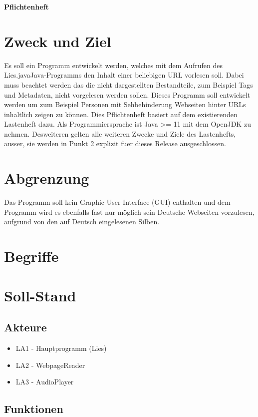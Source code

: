 \documentclass[11pt]{scrartcl}
\begin{document}
\begin{center}
\textbf{Pflichtenheft}
\end{center}

\section{Zweck und Ziel}
Es soll ein Programm entwickelt werden, welches mit dem Aufrufen des \glqq Lies.java\grqq Java-Programms den Inhalt einer beliebigen URL vorlesen soll. Dabei muss beachtet werden das die nicht dargestellten Bestandteile, zum Beispiel Tags und Metadaten, nicht vorgelesen werden sollen. Dieses Programm soll entwickelt werden um zum Beispiel Personen mit Sehbehinderung Webseiten hinter URLs inhaltlich zeigen zu können. Dies Pflichtenheft basiert auf dem existierenden Lastenheft dazu. Als Programmiersprache ist Java >= 11 mit dem OpenJDK zu nehmen. Desweiteren gelten alle weiteren Zwecke und Ziele des Lastenhefts, ausser, sie werden in Punkt 2 explizit fuer dieses Release ausgeschlossen.

\section{Abgrenzung}
Das Programm soll kein Graphic User Interface (GUI) enthalten und dem Programm wird es ebenfalls fast nur möglich sein Deutsche Webseiten vorzulesen, aufgrund von den auf Deutsch eingelesenen Silben.

\section{Begriffe}


\section{Soll-Stand}


\subsection{Akteure}

\begin{itemize}
	\item LA1 - Hauptprogramm (Lies)
	\item LA2 - WebpageReader
	\item LA3 - AudioPlayer
\end{itemize}

\subsection{Funktionen}
\end{document}
